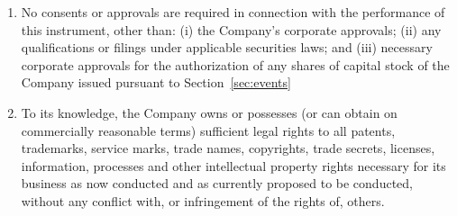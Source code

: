 \begin{enumerate}[label=(\alph*)]
\item {No consents or approvals are required in connection with the
    performance of this instrument, other than: (i) the Company’s
    corporate approvals; (ii) any qualifications or filings under
    applicable securities laws; and (iii) necessary corporate
    approvals for the authorization of any shares of capital stock of
    the Company issued pursuant to Section~\ref{sec:events}}

\item {\begin{sloppypar}To its knowledge, the Company owns or possesses (or can obtain
    on commercially reasonable terms) sufficient legal rights to all
    patents, trademarks, service marks, trade names, copyrights, trade
    secrets, licenses, information, processes and other intellectual
    property rights necessary for its business as now conducted and as
    currently proposed to be conducted, without any conflict with, or
    infringement of the rights of, others.\end{sloppypar}}

\end{enumerate}

